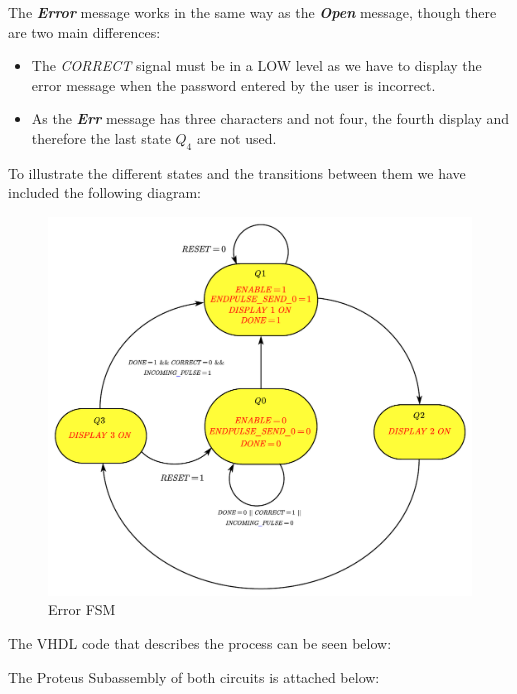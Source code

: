 The \textbf{\textit{Error}} message works in the same way as the \textbf{\textit{Open}} message, though there are two main differences:\medskip

\begin{itemize}
    \item The \textit{CORRECT} signal must be in a LOW level as we have to display the error message when the password entered by the user is incorrect.
    \item As the \textbf{\textit{Err}} message has three characters and not four, the fourth display and therefore the last state \textit{$Q_4$} are not used.
\end{itemize} \medskip

To illustrate the different states and the transitions between them we have included the following diagram:\medskip

\begin{figure}[H]
    \centering
    \includegraphics[scale = 0.6]{Graphics/OPEN-ERROR/ERROR_FSM.pdf}
    \caption{Error FSM}
    \label{fig:ERROR_FSM}
\end{figure}

\clearpage

The VHDL code that describes the process can be seen below:


The Proteus Subassembly of both circuits is attached below:

